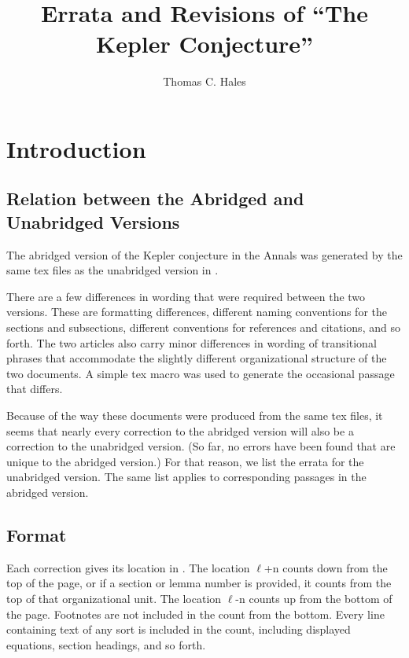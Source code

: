 \documentclass[11pt]{amsart}
\def\line{$\ell$}
\begin{document}
\title{Errata and Revisions of ``The Kepler Conjecture''}

\author{Thomas C. Hales}

\address{Math Department, University of Pittsburgh}


\maketitle

\section{Introduction}


\subsection{Relation between the Abridged and Unabridged Versions}

The abridged version of the Kepler conjecture
in the Annals \cite{A}
was generated by the same tex
files as the unabridged version in \cite{DCG}.


There are a few differences in wording that
were required between the two versions.
These are formatting
differences, different naming
conventions for the sections and subsections,
different conventions for references and citations,
and so forth.
The two articles also carry minor differences
in wording of transitional phrases that
accommodate the slightly different organizational
structure of the two documents.  A simple
tex macro was used to generate the occasional passage
that differs.

Because of the way these documents were produced
from the same tex files,
it seems that nearly every correction to
the abridged version will also be a correction to the unabridged version.
(So far, no errors have been found that are
unique to the abridged version.)
For that reason, we list the errata for the
unabridged version. The same list applies to corresponding 
passages in the abridged version.  




\subsection{Format}

Each correction gives its location in \cite{DCG}.
The location
\line+n counts down from the top of the page, or
if a section or lemma number is provided, it
counts from the top of that organizational unit.
The location \line-n counts up from the bottom
of the page. Footnotes are not included in the
count from the bottom.  Every line containing
text of any sort is included in the count,
including displayed equations, section headings,
and so forth.
\end{document}

